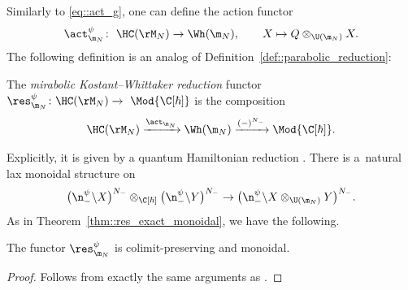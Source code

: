 	Similarly to \eqref{eq::act_g}, one can define the action functor
	\[
	\act_{\m_N}^{\psi}\colon\ \HC(\rM_N) \rightarrow \Wh(\m_N), \qquad X \mapsto Q \otimes_{\U(\m_N)} X.
	\]
	The following definition is an analog of Definition~\ref{def::parabolic_reduction}:
	\begin{Definition}
		The \emph{mirabolic Kostant--Whittaker reduction} functor $\res_{\m_N}^{\psi}  \colon  \HC(\rM_N)  \rightarrow \ \allowbreak\Mod{\C[\hbar]}$ is the composition
		\[
		\HC(\rM_N) \xrightarrow{\act_{\m_N}} \Wh(\m_N) \xrightarrow{(-)^{N_-}} \Mod{\C[\hbar]}.
		\]
	\end{Definition}
	
	Explicitly, it is given by a quantum Hamiltonian reduction . There is a~natural lax monoidal structure on 
	\[
	\bigl(\n_-^{\psi} \backslash X\bigr)^{N_-} \otimes_{\C[\hbar]} \bigl(\n_-^{\psi} \backslash Y\bigr)^{N_-} \rightarrow \bigl(\n_-^{\psi} \backslash X\otimes_{\U(\m_N)} Y\bigr)^{N_-}.
	\]
	As in Theorem~\ref{thm::res_exact_monoidal}, we have the following.
	\begin{Theorem}
		The functor $\res_{\m_N}^{\psi}$ is colimit-preserving and monoidal.
		\begin{proof}
			Follows from exactly the same arguments as \cite[Corollary 4.18]{KalmykovSafronov}.
		\end{proof}
	\end{Theorem}
	
